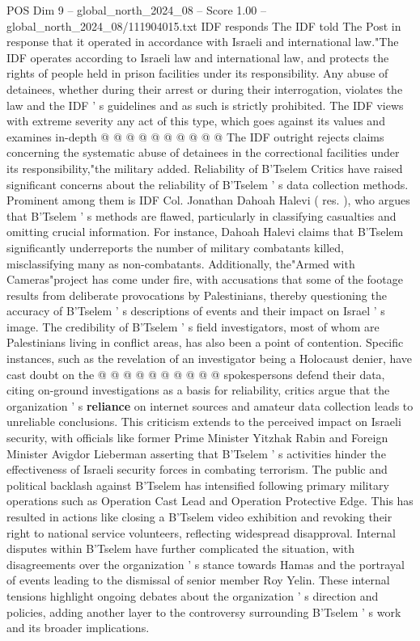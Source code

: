 \begin{textsample}{POS Dim 9 – global\_north\_2024\_08 – Score 1.00 – global\_north\_2024\_08/111904015.txt}
IDF responds The IDF told The Post in response that it operated in accordance with Israeli and international law."The IDF operates according to Israeli law and international law, and protects the rights of people held in prison facilities under its responsibility.
Any abuse of detainees, whether during their arrest or during their interrogation, violates the law and the IDF ' s guidelines and as such is strictly prohibited.
The IDF views with extreme severity any act of this type, which goes against its values and examines in-depth @ @ @ @ @ @ @ @ @ @ The IDF outright rejects claims concerning the systematic abuse of detainees in the correctional facilities under its responsibility,"the military added.
Reliability of B'Tselem Critics have raised significant concerns about the reliability of B'Tselem ' s data collection methods.
Prominent among them is IDF Col.
Jonathan Dahoah Halevi ( res. ), who argues that B'Tselem ' s methods are flawed, particularly in classifying casualties and omitting crucial information.
For instance, Dahoah Halevi claims that B'Tselem significantly underreports the number of military combatants killed, misclassifying many as non-combatants.
Additionally, the"Armed with Cameras"project has come under fire, with accusations that some of the footage results from deliberate provocations by Palestinians, thereby questioning the accuracy of B'Tselem ' s descriptions of events and their impact on Israel ' s image.
The credibility of B'Tselem ' s field investigators, most of whom are Palestinians living in conflict areas, has also been a point of contention.
Specific instances, such as the revelation of an investigator being a Holocaust denier, have cast doubt on the @ @ @ @ @ @ @ @ @ @ spokespersons defend their data, citing on-ground investigations as a basis for reliability, critics argue that the organization ' s \textbf{reliance} on internet sources and amateur data collection leads to unreliable conclusions.
This criticism extends to the perceived impact on Israeli security, with officials like former Prime Minister Yitzhak Rabin and Foreign Minister Avigdor Lieberman asserting that B'Tselem ' s activities hinder the effectiveness of Israeli security forces in combating terrorism.
The public and political backlash against B'Tselem has intensified following primary military operations such as Operation Cast Lead and Operation Protective Edge.
This has resulted in actions like closing a B'Tselem video exhibition and revoking their right to national service volunteers, reflecting widespread disapproval.
Internal disputes within B'Tselem have further complicated the situation, with disagreements over the organization ' s stance towards Hamas and the portrayal of events leading to the dismissal of senior member Roy Yelin.
These internal tensions highlight ongoing debates about the organization ' s direction and policies, adding another layer to the controversy surrounding B'Tselem ' s work and its broader implications.

\end{textsample}
